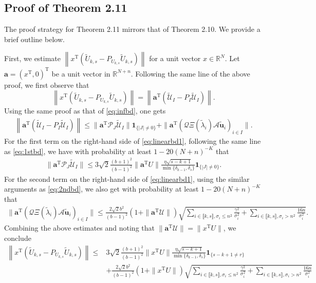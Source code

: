 \documentclass[reqno]{amsart}
\newcommand{\T}{\mathrm{T}}
\theoremstyle{plain}
\theoremstyle{definition}
\begin{document}
\subsection{Proof of Theorem 2.11}\label{sec:prooflinear}
The proof strategy for Theorem 2.11 mirrors that of Theorem 2.10. We provide a brief outline below.

First, we estimate $\left\|x^\T (\widetilde U_{k,s}-P_{U_{k,s}}\widetilde U_{k,s}) \right\|$ for a unit vector $x\in \mathbb R^N$.  Let $\mathbf a=(x^\T, 0)^\T$ be a unit vector in $\mathbb{R}^{N+n}$.    Following the same line of the above proof, we first observe that
$$\left\|x^\T (\widetilde U_{k,s}-P_{U_{k,s}}\widetilde U_{k,s}) \right\| = \left\|\mathbf a^\T (\widetilde{\mathcal U}_I - P_I \widetilde{\mathcal U}_I) \right\|.$$
Using the same proof as that of \eqref{eq:infbd}, one gets
\begin{align}\label{eq:linearbd1}
\left\|\mathbf a^\T (\widetilde{\mathcal U}_I - P_I \widetilde{\mathcal U}_I) \right\| \le \|\mathbf a^\T \mathcal P_J \widetilde{\mathcal U}_I\| \mathbf{1}_{\{|J| \neq 0 \}} +  \|\mathbf a^\T (\mathcal Q \Xi(\widetilde \lambda_i) \mathcal A \widetilde{\mathbf u}_i)_{i\in I}\|.
\end{align}
For the first term on the right-hand side of \eqref{eq:linearbd1}, following the same line as \eqref{eq:1stbd}, we have with probability at least $1-20(N+n)^{-K}$ that
\begin{align*}
\|\mathbf a^\T \mathcal P_J \widetilde{\mathcal U}_I\|\le  3\sqrt{2}\frac{(b+1)^2}{(b-1)^2}  \| \mathbf a^\T U\| \frac{\eta\sqrt{s-k+1}}{\min\{\delta_{k-1}, \delta_s\}} \mathbf{1}_{\{|J| \neq 0 \}}.
\end{align*}
For the second term on the right-hand side of \eqref{eq:linearbd1}, using the similar arguments as \eqref{eq:2ndbd}, we also get with probability at least $1-20(N+n)^{-K}$ that
\begin{align*}
\|\mathbf a^\T (\mathcal Q \Xi(\widetilde \lambda_i) \mathcal A \widetilde{\mathbf u}_i)_{i\in I}\| \le \frac{2\sqrt{2} b^2}{(b-1)^2} (1+ \| \mathbf a^\T \mathcal U \|) \sqrt{\sum_{i\in \llbracket k, s\rrbracket, \sigma_i\le n^2} \frac{\gamma^2}{\sigma_i^2} +  \sum_{i\in \llbracket k, s\rrbracket, \sigma_i> n^2} \frac{16 n}{\sigma_i^2} }.
\end{align*}
Combining the above estimates and noting that $\| \mathbf a^\T \mathcal U \|=\| x^\T  U \|$, we conclude 
\begin{align*}
\left\|x^\T (\widetilde U_{k,s}-P_{U_{k,s}}\widetilde U_{k,s}) \right\| \le & 3\sqrt{2}\frac{(b+1)^2}{(b-1)^2}  \| x^\T  U \| \frac{\eta\sqrt{s-k+1}}{\min\{\delta_{k-1}, \delta_s\}}  \mathbf{1}_{\{s-k+1\neq r\}}\\
 &+ \frac{2\sqrt{2} b^2}{(b-1)^2} (1+\| x^\T  U \|) \sqrt{\sum_{i\in \llbracket k, s\rrbracket, \sigma_i\le n^2} \frac{\gamma^2}{\sigma_i^2} + \sum_{i\in \llbracket k, s\rrbracket, \sigma_i> n^2} \frac{16 n}{\sigma_i^2}}
\end{align*}
\end{document}
